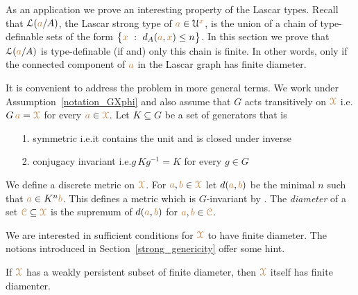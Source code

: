 As an application we prove an interesting property of the Lascar types.
Recall that $\EuScript L({\color{brown} a}/A)$, the Lascar strong type of ${\color{brown} a}\in\EuScript U^{\color{brown} x}$, is the union of a chain of type-definable sets of the form $\big\{{\color{brown} x}\ :\ d_A({\color{brown} a},{\color{brown} x})\le n\big\}$.
In this section we prove that $\EuScript L({\color{brown} a}/A)$ is type-definable (if and) only this chain is finite.
In other words, only if the connected component of ${\color{brown} a}$ in the Lascar graph has finite diameter.

It is convenient to address the problem in more general terms.
We work under Assumption~\ref{notation_GXphi} and also assume that $G$ acts transitively on ${\color{brown}\EuScript X}$ i.e.\@ $G\,{\color{brown} a}={\color{brown}\EuScript X}$ for every ${\color{brown} a}\in{\color{brown}\EuScript X}$.
Let $K\subseteq G$ be a set of generators that is
\begin{itemize}
  \item[1.] symmetric i.e.\@ it contains the unit and is closed under inverse
  \item[2.] conjugacy invariant i.e.\@ $g\,Kg^{-1}=K$ for every $g\in G$
\end{itemize}

We define a discrete metric on ${\color{brown}\EuScript X}$.
For ${\color{brown} a},{\color{brown} b}\in{\color{brown}\EuScript X}$ let $d({\color{brown} a},{\color{brown} b})$ be the minimal $n$ such that ${\color{brown} a}\in K^n{\color{brown} b}$.
This defines a metric which is $G$-invariant by .
The \emph{diameter\/} of a set ${\color{brown}\EuScript C}\subseteq{\color{brown}\EuScript X}$ is the supremum of $d({\color{brown} a},{\color{brown} b})$ for ${\color{brown} a},{\color{brown} b}\in{\color{brown}\EuScript C}$.

We are interested in sufficient conditions for ${\color{brown}\EuScript X}$ to have finite diameter.
The notions introduced in Section~\ref{strong_genericity} offer some hint.

\begin{proposition}\label{prop_wpers_finite_diameter}
  If ${\color{brown}\EuScript X}$ has a weakly persistent subset of finite diameter, then ${\color{brown}\EuScript X}$ itself has finite diamenter.
\end{proposition}

